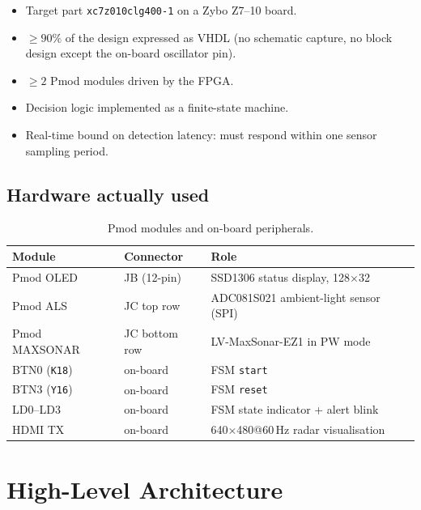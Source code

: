 \documentclass[11pt,a4paper]{article}
\begin{document}
\begin{itemize}[leftmargin=*]
  \item Target part \texttt{xc7z010clg400-1} on a Zybo Z7--10 board.
  \item $\geq 90\%$ of the design expressed as VHDL (no schematic capture, no
        block design except the on-board oscillator pin).
  \item $\geq 2$ Pmod modules driven by the FPGA.
  \item Decision logic implemented as a finite-state machine.
  \item Real-time bound on detection latency: must respond within one
        sensor sampling period.
\end{itemize}

\subsection{Hardware actually used}

\begin{table}[h]
  \centering
  \caption{Pmod modules and on-board peripherals.}
  \begin{tabular}{@{}lll@{}}
    \toprule
    Module & Connector  & Role \\
    \midrule
    Pmod OLED       & JB (12-pin) & SSD1306 status display, 128$\times$32 \\
    Pmod ALS        & JC top row  & ADC081S021 ambient-light sensor (SPI) \\
    Pmod MAXSONAR   & JC bottom row & LV-MaxSonar-EZ1 in PW mode \\
    BTN0 (\texttt{K18}) & on-board & FSM \texttt{start} \\
    BTN3 (\texttt{Y16}) & on-board & FSM \texttt{reset} \\
    LD0--LD3        & on-board & FSM state indicator + alert blink \\
    HDMI TX         & on-board & 640$\times$480@60\,Hz radar visualisation \\
    \bottomrule
  \end{tabular}
\end{table}

\section{High-Level Architecture}
\end{document}
